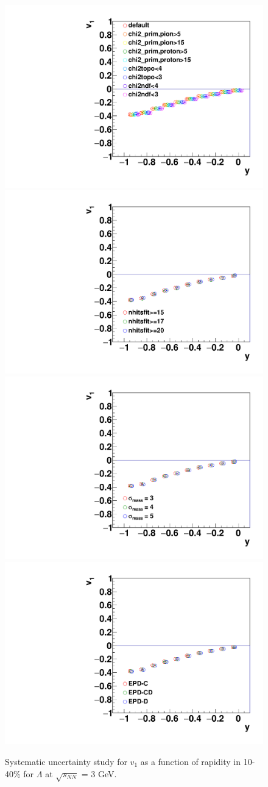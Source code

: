 \begin{figure}[h]
\includegraphics[width=0.49\linewidth]{chapterX/fig/ld_sys_cut_v1.pdf}
\includegraphics[width=0.49\linewidth]{chapterX/fig/ld_sys_cut_v1_nhits.pdf}
\includegraphics[width=0.49\linewidth]{FXT3gev/chapterX/fig/ld_sys_cut_v1_msigma.pdf}
\includegraphics[width=0.49\linewidth]{FXT3gev/chapterX/fig/ld_sys_cut_v1_epdres.pdf}
\caption{Systematic uncertainty study for $v_{1}$ as a function of rapidity in 10-40\% for $\Lambda$ at $\sqrt{s_{NN}}$ = 3 GeV.}
\label{lambda_v1y_sys}
\end{figure}

